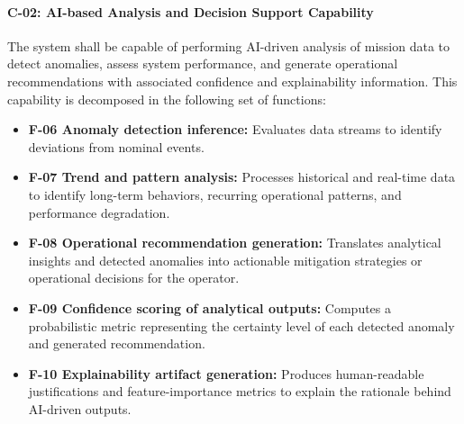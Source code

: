 \paragraph{C-02: AI-based Analysis and Decision Support Capability}
The system shall be capable of performing AI-driven analysis of mission data to detect anomalies, assess system performance, and generate operational recommendations with associated confidence and explainability information. This capability is decomposed in the following set of functions:
\begin{itemize}
    \item \textbf{F-06 Anomaly detection inference:} Evaluates data streams to identify deviations from nominal events.
    \item \textbf{F-07 Trend and pattern analysis:} Processes historical and real-time data to identify long-term behaviors, recurring operational patterns, and performance degradation.
    \item \textbf{F-08 Operational recommendation generation:} Translates analytical insights and detected anomalies into actionable mitigation strategies or operational decisions for the operator.
    \item \textbf{F-09 Confidence scoring of analytical outputs:} Computes a probabilistic metric representing the certainty level of each detected anomaly and generated recommendation.
    \item \textbf{F-10 Explainability artifact generation:} Produces human-readable justifications and feature-importance metrics to explain the rationale behind AI-driven outputs.
\end{itemize}

